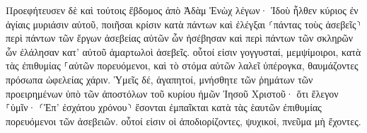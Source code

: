 \documentclass{openreader}
\begin{document}
Προεφήτευσεν δὲ καὶ τούτοις ἕβδομος ἀπὸ Ἀδὰμ Ἑνὼχ λέγων· Ἰδοὺ ἦλθεν κύριος ἐν ἁγίαις μυριάσιν αὐτοῦ, 
ποιῆσαι κρίσιν κατὰ πάντων καὶ ἐλέγξαι ⸂πάντας τοὺς ἀσεβεῖς⸃ περὶ πάντων τῶν ἔργων ἀσεβείας αὐτῶν ὧν ἠσέβησαν καὶ περὶ πάντων τῶν σκληρῶν ὧν ἐλάλησαν κατ’ αὐτοῦ ἁμαρτωλοὶ ἀσεβεῖς. 
οὗτοί εἰσιν γογγυσταί, μεμψίμοιροι, κατὰ τὰς ἐπιθυμίας ⸀αὐτῶν πορευόμενοι, καὶ τὸ στόμα αὐτῶν λαλεῖ ὑπέρογκα, θαυμάζοντες πρόσωπα ὠφελείας χάριν. 
Ὑμεῖς δέ, ἀγαπητοί, μνήσθητε τῶν ῥημάτων τῶν προειρημένων ὑπὸ τῶν ἀποστόλων τοῦ κυρίου ἡμῶν Ἰησοῦ Χριστοῦ· 
ὅτι ἔλεγον ⸀ὑμῖν· ⸂Ἐπ’ ἐσχάτου χρόνου⸃ ἔσονται ἐμπαῖκται κατὰ τὰς ἑαυτῶν ἐπιθυμίας πορευόμενοι τῶν ἀσεβειῶν. 
οὗτοί εἰσιν οἱ ἀποδιορίζοντες, ψυχικοί, πνεῦμα μὴ ἔχοντες. 
\end{document}
